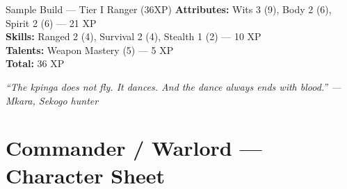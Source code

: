 \documentclass[10pt]{article}
\begin{document}
\begin{Form}
\begin{minipage}[t]{0.48\linewidth}
    \begin{charbox}{Sample Build --- Tier I Ranger (36XP)}
        \textbf{Attributes:} Wits 3 (9), Body 2 (6), Spirit 2 (6) --- 21 XP\\
        \textbf{Skills:} Ranged 2 (4), Survival 2 (4), Stealth 1 (2) --- 10 XP\\
        \textbf{Talents:} Weapon Mastery (5) --- 5 XP\\
        \textbf{Total:} 36 XP
    \end{charbox}
\end{minipage}

\vspace{0.5em}
\begin{center}
    {\small\sffamily\itshape ``The kpinga does not fly. It dances. And the dance always ends with blood.'' --- Mkara, Sekogo hunter}
    
    \vspace{0.3em}
    \PushButton[name=calcBtnRanger, onclick={this.calculateRanger();}, borderwidth=1pt, bordercolor=blue, backgroundcolor=sectionbg, color=white, width=4cm, height=0.6cm]{\textbf{\textcolor{white}{Calculate Totals}}}
    \quad
    \PushButton[name=resetBtnRanger, onclick={this.resetForm();}, borderwidth=1pt, bordercolor=red!60, backgroundcolor=red!40, color=white, width=4cm, height=0.6cm]{\textbf{\textcolor{white}{Reset Form}}}
\end{center}

\end{Form}
\newpage

\section*{Commander / Warlord --- Character Sheet}
\end{document}
